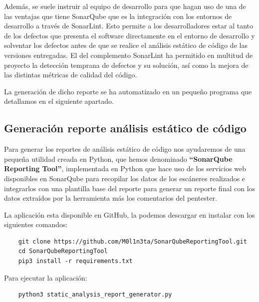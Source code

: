 Además, se suele instruir al equipo de desarrollo para que hagan uso de una de las ventajas que tiene SonarQube 
que es la integración con los entornos de desarrollo a través de SonarLint. Esto permite a los desarrolladores 
estar al tanto de los defectos que presenta el software directamente en el entorno de desarrollo y solventar 
los defectos antes de que se realice el análisis estático de código de las versiones entregadas. El del complemento SonarLint
 ha permitido en multitud de proyecto la detección temprana de defectos y su solución, así como la mejora 
 de las distintas métricas de calidad del código.

La generación de dicho reporte se ha automatizado en un pequeño programa que detallamos en el siguiente apartado.
\clearpage

\subsection{Generación reporte análisis estático de código}

Para generar los reportes de análisis estático de código nos ayudaremos de una pequeña utilidad creada en Python, que hemos 
denominado \textbf{“SonarQube Reporting Tool”}, implementada en Python que hace uso de los servicios web disponibles en SonarQube
para recopilar los datos de los escáneres realizados e integrarlos con una plantilla base del 
reporte para generar un reporte final con los datos extraídos por la herramienta más los comentarios del pentester.

La aplicación esta disponible en GitHub, la podemos descargar en instalar con los siguientes comandos:
\begin{verbatim}
    git clone https://github.com/M0l1n3ta/SonarQubeReportingTool.git
    cd SonarQubeReportingTool
    pip3 install -r requirements.txt
\end{verbatim}

Para ejecutar la aplicación:
\begin{verbatim}
    python3 static_analysis_report_generator.py
\end{verbatim}

